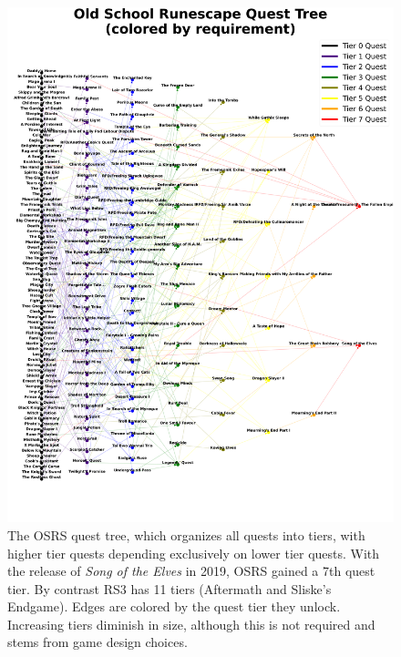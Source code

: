 \begin{figure}
	\centering
	\includegraphics[width=\linewidth]{img/quests/osrs_by_requirement.pdf}
	\caption{
		The OSRS quest tree, which organizes all quests into tiers, with higher tier quests depending exclusively on lower tier quests. With the release of \emph{Song of the Elves} in 2019, OSRS gained a 7th quest tier. By contrast RS3 has 11 tiers (Aftermath and Sliske's Endgame). Edges are colored by the quest tier they unlock. Increasing tiers diminish in size, although this is not required and stems from game design choices.
	}
	\label{fig:quests_by_requirement}
\end{figure}



